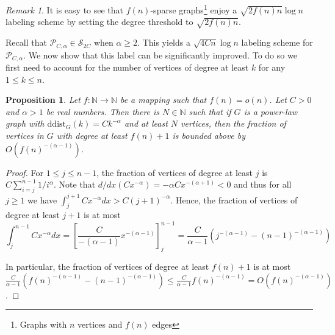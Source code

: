 \documentclass{article}
\newtheorem{proposition}{Proposition}
\theoremstyle{remark}
\newtheorem{remark}{Remark}
\begin{document}
\begin{remark}
It is easy to see that $f(n)$-sparse graphs\footnote{Graphs with $n$ vertices and  $f(n)$ edges}
enjoy a  $\sqrt{2f(n)n} \log n$ labeling scheme by setting the degree threshold to $\sqrt{2f(n)n}$.
\end{remark}
Recall that  $\mathcal{P}_{C,\alpha} \in \mathcal{S}_{2C}$ when $\alpha \geq 2$.  This yields a $\sqrt{4C n} \log n$ labeling scheme for $\mathcal{P}_{C,\alpha}$.
We now show that this label can be significantly improved. To do so we first need to account for the number of vertices of degree at least $k$ for any $1\leq k \leq n$.
\begin{proposition}\label{prop:smallfraction}
Let $f : \mathbb{N} \longrightarrow \mathbb{N}$ be a mapping such that
$f(n) = o(n)$. Let $C > 0$ and $\alpha > 1$ be real numbers. Then
there is $N \in \mathbb{N}$ such that if $G$ is a power-law graph with $\mathrm{ddist}_G(k) = C k^{-\alpha}$
and at least $N$ vertices, then the fraction of vertices in $G$ with degree at least $f(n) + 1$
is bounded above by $O(f(n)^{-(\alpha-1)})$.
\end{proposition}

\begin{proof}
For $1 \leq j \leq n - 1$, the fraction of vertices of degree at least $j$
is $C\sum_{i=j}^{n-1} 1/i^{\alpha}.$
Note that $d/dx (Cx^{-\alpha}) =  -\alpha C x^{-(\alpha + 1)} < 0$
and thus  for all $j \geq 1$ we have $\int_{j}^{j+1} Cx^{-\alpha} dx > C(j+1)^{-\alpha}$.
Hence, the fraction of vertices of degree at least $j+1$ is at most
$$
\int_j^{n-1} C x^{-\alpha} dx = \left[ \frac{C}{-(\alpha - 1)} x^{-(\alpha-1)} \right]_j^{n-1}
= \frac{C}{\alpha - 1}\left(j^{-(\alpha - 1)} - (n-1)^{-(\alpha -1 )} \right)
$$

In particular, the fraction of vertices of degree at least $f(n) + 1$ is at most
 $\frac{C}{\alpha - 1}\left(f(n)^{-(\alpha - 1)} - (n-1)^{-(\alpha -1 )} \right)
\leq \frac{C}{\alpha - 1} f(n)^{-(\alpha - 1)} = O(f(n)^{-(\alpha - 1)})$.
\end{proof}
\end{document}
